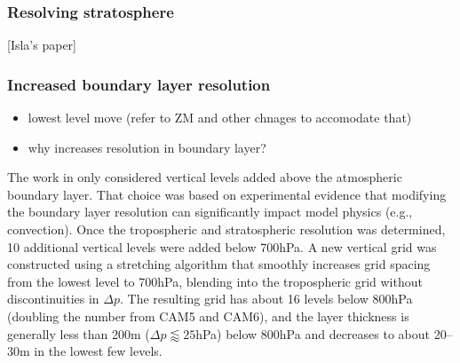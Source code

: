\documentclass[draft]{agujournal2019}
\begin{document}
 \subsubsection{Resolving stratosphere}
[Isla's paper]
\subsubsection{Increased boundary layer resolution}
\begin{itemize}
    \item lowest level move (refer to ZM and other chnages to accomodate that)
    \item why increases resolution in boundary layer?
\end{itemize}
The work in  only considered vertical levels added above the atmospheric boundary layer. That choice was based on experimental evidence that modifying the boundary layer resolution can significantly impact model physics (e.g., convection). Once the tropospheric and stratospheric resolution was determined, 10 additional vertical levels were added below 700hPa. A new vertical grid was constructed using a stretching algorithm \cite{Eriksson:1982} that smoothly increases grid spacing from the lowest level to 700hPa, blending into the tropospheric grid without discontinuities in $\Delta p$. The resulting grid has about 16 levels below 800hPa (doubling the number from CAM5 and CAM6), and the layer thickness is generally less than 200m ($\Delta p \lessapprox 25$hPa) below 800hPa and decreases to about 20--30m in the lowest few levels.
\end{document}
